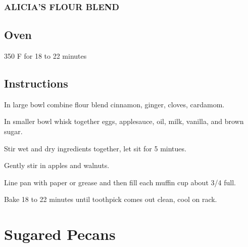 \documentclass[ansiapaper,10pt,english]{sphinxmanual}
\begin{document}
\subsection{ALICIA’S FLOUR BLEND}
\label{\detokenize{Double_ASM:alicia-s-flour-blend}}
%
\begin{sphinxVerbatim}[commandchars=\\\{\}]
   

    

   

   

   

   

  
\end{sphinxVerbatim}


\section{Oven}
\label{\detokenize{Double_ASM:oven}}
350 F for 18 to 22 minutes


\section{Instructions}
\label{\detokenize{Double_ASM:instructions}}
In large bowl combine flour blend cinnamon, ginger, cloves, cardamom.

In smaller bowl whisk together eggs, applesauce, oil, milk, vanilla, and brown sugar.

Stir wet and dry ingredients together, let sit for 5 mintues.

Gently stir in apples and walnuts.

Line pan with paper or grease and then fill each muffin cup about 3/4 full.

Bake 18 to 22 minutes until toothpick comes out clean, cool on rack.


\chapter{Sugared Pecans}
\label{\detokenize{Candied_Pecans:sugared-pecans}}\label{\detokenize{Candied_Pecans::doc}}
\end{document}
